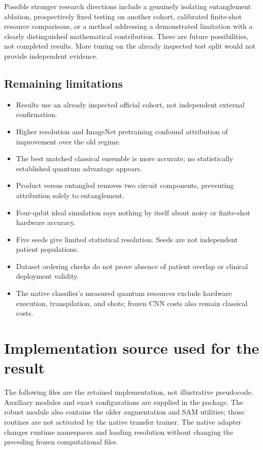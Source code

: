 \documentclass[11pt,a4paper]{report}
\begin{document}
Possible stronger research directions include a genuinely isolating entanglement ablation, prospectively fixed testing on another cohort, calibrated finite-shot resource comparisons, or a method addressing a demonstrated limitation with a clearly distinguished mathematical contribution. These are future possibilities, not completed results. More tuning on the already inspected test split would not provide independent evidence.

\section{Remaining limitations}
\begin{itemize}
\item Results use an already inspected official cohort, not independent external confirmation.
\item Higher resolution and ImageNet pretraining confound attribution of improvement over the old regime.
\item The best matched classical ensemble is more accurate; no statistically established quantum advantage appears.
\item Product versus entangled removes two circuit components, preventing attribution solely to entanglement.
\item Four-qubit ideal simulation says nothing by itself about noisy or finite-shot hardware accuracy.
\item Five seeds give limited statistical resolution. Seeds are not independent patient populations.
\item Dataset ordering checks do not prove absence of patient overlap or clinical deployment validity.
\item The native classifier's measured quantum resources exclude hardware execution, transpilation, and shots; frozen CNN costs also remain classical costs.
\end{itemize}

\appendix
\chapter{Implementation source used for the result}
The following files are the retained implementation, not illustrative pseudocode. Auxiliary modules and exact configurations are supplied in the package. The robust module also contains the older augmentation and SAM utilities; those routines are not activated by the native transfer trainer. The native adapter changes runtime namespaces and loading resolution without changing the preceding frozen computational files.
\end{document}
